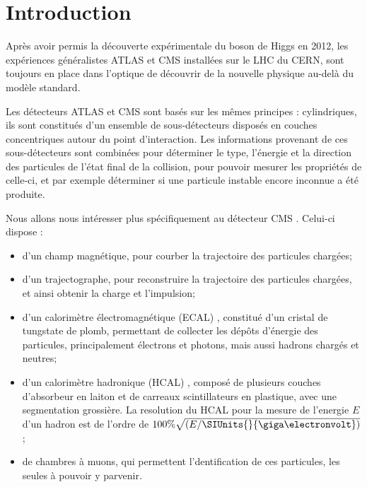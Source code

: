 \documentclass[11pt,a4paper]{article}
\begin{document}
\newpage
\thispagestyle{empty}
\tableofcontents
\setcounter{page}{1}

\setlength{\parindent}{16pt}





\newpage
\section{Introduction}
Après avoir permis la découverte expérimentale du boson de Higgs en 2012, les expériences généralistes ATLAS \cite{HiggsATLAS} et CMS \cite{HiggsCMS} installées sur le LHC du CERN, sont toujours en place dans l'optique de découvrir de la nouvelle physique au-delà du modèle standard.

Les détecteurs ATLAS et CMS sont basés sur les mêmes principes : cylindriques, ils sont constitués d'un ensemble de sous-détecteurs disposés en couches concentriques autour du point d'interaction. Les informations provenant de ces sous-détecteurs sont combinées pour déterminer le type, l'énergie et la direction des particules de l'état final de la collision, pour pouvoir mesurer les propriétés de celle-ci, et par exemple déterminer si une particule instable encore inconnue a été produite. 

Nous allons nous intéresser plus spécifiquement au détecteur CMS \cite{CMS}. Celui-ci dispose  :
\begin{itemize}
\item d'un champ magnétique, pour courber la trajectoire des particules chargées;
\item d'un trajectographe, pour reconstruire la trajectoire des particules chargées, et ainsi obtenir la charge et l'impulsion;
\item d'un calorimètre électromagnétique (ECAL) \cite{ECAL}, constitué d'un cristal de tungstate de plomb, permettant de collecter les dépôts d'énergie des particules, principalement électrons et photons, mais aussi hadrons chargés et neutres;
\item d'un calorimètre hadronique (HCAL) \cite{HCAL}, composé de plusieurs couches d'absorbeur en laiton et de carreaux scintillateurs en plastique, avec une segmentation grossière. La resolution du HCAL pour la mesure de l'energie $E$ d'un hadron est de l'ordre de $100\%\sqrt{(E / \SIUnits{}{\giga\electronvolt})}$;
\item de chambres à muons, qui permettent l'dentification de ces particules, les seules à pouvoir y parvenir.
\end{itemize}
\end{document}
